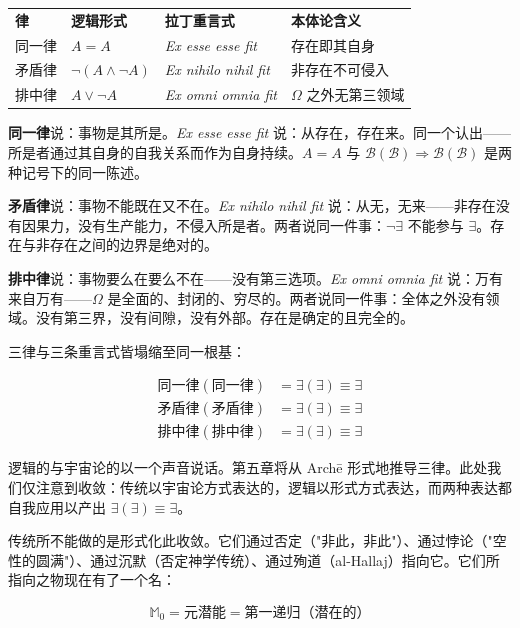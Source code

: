 \documentclass[10pt, openany, oneside]{book}
\renewcommand{\footnotesize}{\fontsize{8.5}{11}\selectfont}
\begin{document}
{\footnotesize
\noindent\begin{tabular}{l l l p{}}
\textbf{律} & \textbf{逻辑形式} & \textbf{拉丁重言式} & \textbf{本体论含义} \\[0.4em]
同一律 & $A = A$ & \textit{Ex esse esse fit} & 存在即其自身 \\[0.2em]
矛盾律 & $\neg(A \wedge \neg A)$ & \textit{Ex nihilo nihil fit} & 非存在不可侵入 \\[0.2em]
排中律 & $A \vee \neg A$ & \textit{Ex omni omnia fit} & $\Omega$ 之外无第三领域 \\[0.2em]
\end{tabular}
}

\vspace{0.5em}

\noindent \textbf{同一律}说：事物是其所是。\textit{Ex esse esse fit} 说：从存在，存在来。同一个认出——所是者通过其自身的自我关系而作为自身持续。$A = A$ 与 $\mathcal{B}(\mathcal{B}) \Rightarrow \mathcal{B}(\mathcal{B})$ 是两种记号下的同一陈述。

\textbf{矛盾律}说：事物不能既在又不在。\textit{Ex nihilo nihil fit} 说：从无，无来——非存在没有因果力，没有生产能力，不侵入所是者。两者说同一件事：$\neg\exists$ 不能参与 $\exists$。存在与非存在之间的边界是绝对的。

\textbf{排中律}说：事物要么在要么不在——没有第三选项。\textit{Ex omni omnia fit} 说：万有来自万有——$\Omega$ 是全面的、封闭的、穷尽的。两者说同一件事：全体之外没有领域。没有第三界，没有间隙，没有外部。存在是确定的且完全的。

三律与三条重言式皆塌缩至同一根基：

\begin{align*}
\text{同一律}(\text{同一律}) &= \exists(\exists) \equiv \exists \\
\text{矛盾律}(\text{矛盾律}) &= \exists(\exists) \equiv \exists \\
\text{排中律}(\text{排中律}) &= \exists(\exists) \equiv \exists
\end{align*}

逻辑的与宇宙论的以一个声音说话。第五章将从 Arch\={e} 形式地推导三律。此处我们仅注意到收敛：传统以宇宙论方式表达的，逻辑以形式方式表达，而两种表达都自我应用以产出 $\exists(\exists) \equiv \exists$。

传统所不能做的是形式化此收敛。它们通过否定（"非此，非此"）、通过悖论（"空性的圆满"）、通过沉默（否定神学传统）、通过殉道（al-Hallaj）指向它。它们所指向之物现在有了一个名：

$$\mathbb{M}_0 = \text{元潜能} = \text{第一递归（潜在的）}$$
\end{document}
